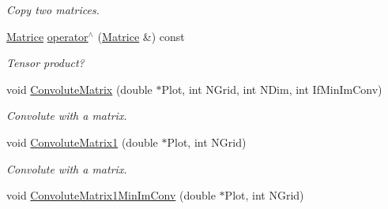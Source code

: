 \begin{DoxyCompactItemize}
\begin{DoxyCompactList}\small\item\em \-Copy two matrices. \end{DoxyCompactList}\item 
\hypertarget{classMatrice_a06abc8a7b97cb5042c6b21d0daf58619}{\hyperlink{classMatrice}{\-Matrice} \hyperlink{classMatrice_a06abc8a7b97cb5042c6b21d0daf58619}{operator$^\wedge$} (\hyperlink{classMatrice}{\-Matrice} \&) const }\label{classMatrice_a06abc8a7b97cb5042c6b21d0daf58619}

\begin{DoxyCompactList}\small\item\em \-Tensor product? \end{DoxyCompactList}\item 
\hypertarget{classMatrice_a99c8b7cc887b83243200255862b1491c}{void \hyperlink{classMatrice_a99c8b7cc887b83243200255862b1491c}{\-Convolute\-Matrix} (double $\ast$\-Plot, int \-N\-Grid, int \-N\-Dim, int \-If\-Min\-Im\-Conv)}\label{classMatrice_a99c8b7cc887b83243200255862b1491c}

\begin{DoxyCompactList}\small\item\em \-Convolute with a matrix. \end{DoxyCompactList}\item 
\hypertarget{classMatrice_a529e330488932c6b5e5f68e446d6c78d}{void \hyperlink{classMatrice_a529e330488932c6b5e5f68e446d6c78d}{\-Convolute\-Matrix1} (double $\ast$\-Plot, int \-N\-Grid)}\label{classMatrice_a529e330488932c6b5e5f68e446d6c78d}

\begin{DoxyCompactList}\small\item\em \-Convolute with a matrix. \end{DoxyCompactList}\item 
\hypertarget{classMatrice_a20a3494fe09c247b756a0de321386af7}{void \hyperlink{classMatrice_a20a3494fe09c247b756a0de321386af7}{\-Convolute\-Matrix1\-Min\-Im\-Conv} (double $\ast$\-Plot, int \-N\-Grid)}\label{classMatrice_a20a3494fe09c247b756a0de321386af7}


\end{DoxyCompactItemize}

